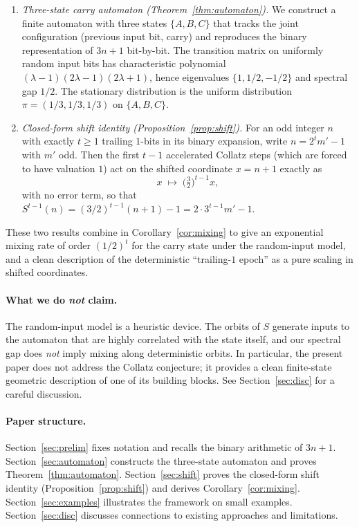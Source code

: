 \documentclass[11pt,a4paper]{article}
\theoremstyle{definition}
\theoremstyle{remark}
\begin{document}
\begin{enumerate}[label=(\roman*),leftmargin=2em]
  \item \emph{Three-state carry automaton (Theorem~\ref{thm:automaton}).}
    We construct a finite automaton with three states $\{A, B, C\}$
    that tracks the joint configuration (previous input bit, carry) and
    reproduces the binary representation of $3n+1$ bit-by-bit.  The
    transition matrix on uniformly random input bits has characteristic
    polynomial $(\lambda - 1)(2\lambda - 1)(2\lambda + 1)$, hence
    eigenvalues $\{1, 1/2, -1/2\}$ and spectral gap $1/2$.  The
    stationary distribution is the uniform distribution
    $\pi = (1/3, 1/3, 1/3)$ on $\{A, B, C\}$.

  \item \emph{Closed-form shift identity (Proposition~\ref{prop:shift}).}
    For an odd integer $n$ with exactly $t \geq 1$ trailing $1$-bits in
    its binary expansion, write $n = 2^t m' - 1$ with $m'$ odd.  Then
    the first $t-1$ accelerated Collatz steps (which are forced to have
    valuation $1$) act on the shifted coordinate $x = n+1$ exactly as
    \[
      x \;\longmapsto\; \bigl(\tfrac{3}{2}\bigr)^{t-1} x,
    \]
    with no error term, so that
    $S^{t-1}(n) = (3/2)^{t-1}(n+1) - 1 = 2 \cdot 3^{t-1} m' - 1$.
\end{enumerate}

These two results combine in Corollary~\ref{cor:mixing} to give an
exponential mixing rate of order $(1/2)^t$ for the carry state under
the random-input model, and a clean description of the deterministic
``trailing-$1$ epoch'' as a pure scaling in shifted coordinates.

\paragraph{What we do \emph{not} claim.}
The random-input model is a heuristic device.  The orbits of $S$
generate inputs to the automaton that are highly correlated with the
state itself, and our spectral gap does \emph{not} imply mixing along
deterministic orbits.  In particular, the present paper does not address
the Collatz conjecture; it provides a clean finite-state geometric
description of one of its building blocks.  See Section~\ref{sec:disc}
for a careful discussion.

\paragraph{Paper structure.}
Section~\ref{sec:prelim} fixes notation and recalls the binary
arithmetic of $3n+1$.  Section~\ref{sec:automaton} constructs the
three-state automaton and proves Theorem~\ref{thm:automaton}.
Section~\ref{sec:shift} proves the closed-form shift identity
(Proposition~\ref{prop:shift}) and derives Corollary~\ref{cor:mixing}.
Section~\ref{sec:examples} illustrates the framework on small examples.
Section~\ref{sec:disc} discusses connections to existing approaches and
limitations.
\end{document}
